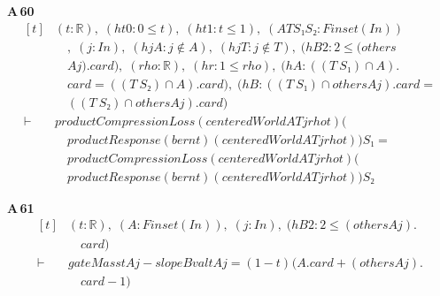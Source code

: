 \noindent\textbf{A\,60}\quad{}
{\footnotesize\[ \begin{aligned}[t]
&(\mathit{t} : \mathbb{R} ),\; (\mathit{ht0} : 0 \leq \mathit{t}),\; (\mathit{ht1} : \mathit{t} \leq 1),\; (\mathit{A} \mathit{T} \mathit{S₁} \mathit{S₂} : \mathit{Finset} (\mathit{I} \mathit{n}))\\
&\quad ,\; (\mathit{j} : \mathit{I} \mathit{n}),\; (\mathit{hjA} : \mathit{j} \notin \mathit{A}),\; (\mathit{hjT} : \mathit{j} \notin \mathit{T}),\; (\mathit{hB2} : 2 \leq (\mathit{others}\\
&\quad \mathit{A} \mathit{j}).\mathit{card}),\; (\mathit{rho} : \mathbb{R} ),\; (\mathit{hr} : 1 \leq \mathit{rho}),\; (\mathit{hA} : ((\mathit{T} \ \mathit{S₁}) \cap \mathit{A}).\\
&\quad \mathit{card} = ((\mathit{T} \ \mathit{S₂}) \cap \mathit{A}).\mathit{card}),\; (\mathit{hB} : ((\mathit{T} \ \mathit{S₁}) \cap \mathit{others} \mathit{A} \mathit{j}).\mathit{card} =\\
&\quad ((\mathit{T} \ \mathit{S₂}) \cap \mathit{others} \mathit{A} \mathit{j}).\mathit{card})\\
\vdash\;&\mathit{productCompressionLoss} (\mathit{centeredWorld} \mathit{A} \mathit{T} \mathit{j} \mathit{rho} \mathit{t}) (\\
&\quad \mathit{productResponse} (\mathit{bern} \mathit{t}) (\mathit{centeredWorld} \mathit{A} \mathit{T} \mathit{j} \mathit{rho} \mathit{t})) \mathit{S₁} =\\
&\quad \mathit{productCompressionLoss} (\mathit{centeredWorld} \mathit{A} \mathit{T} \mathit{j} \mathit{rho} \mathit{t}) (\\
&\quad \mathit{productResponse} (\mathit{bern} \mathit{t}) (\mathit{centeredWorld} \mathit{A} \mathit{T} \mathit{j} \mathit{rho} \mathit{t})) \mathit{S₂}
\end{aligned} \]}

\noindent\textbf{A\,61}\quad{}
{\footnotesize\[ \begin{aligned}[t]
&(\mathit{t} : \mathbb{R} ),\; (\mathit{A} : \mathit{Finset} (\mathit{I} \mathit{n})),\; (\mathit{j} : \mathit{I} \mathit{n}),\; (\mathit{hB2} : 2 \leq (\mathit{others} \mathit{A} \mathit{j}).\\
&\quad \mathit{card})\\
\vdash\;&\mathit{gateMass} \mathit{t} \mathit{A} \mathit{j}-\mathit{slopeBval} \mathit{t} \mathit{A} \mathit{j} = (1-\mathit{t})^{}(\mathit{A}.\mathit{card}+(\mathit{others} \mathit{A} \mathit{j}).\\
&\quad \mathit{card}-1)
\end{aligned} \]}

